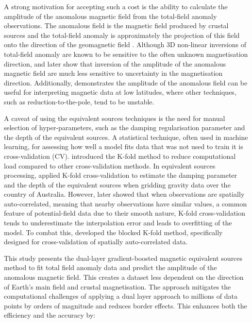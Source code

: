 A strong motivation for accepting such a cost is the ability to calculate the amplitude of the anomalous magnetic field from the total-field anomaly observations. The anomalous field is the magnetic field produced by crustal sources and the total-field anomaly is approximately the projection of this field onto the direction of the geomagnetic field \citep{Blakley1995}. Although 3D non-linear inversions of total-field anomaly are known to be sensitive to the often unknown magnetisation direction, \citet{Li2010_remanent} and later \citet{HidalgoGato2021} show that inversion of the amplitude of the anomalous magnetic field are much less sensitive to uncertainty in the magnetisation direction. Additionally, \citet{Melo2021} demonstrates the amplitude of the anomalous field can be useful for interpreting magnetic data at low latitudes, where other techniques, such as reduction-to-the-pole, tend to be unstable.

A caveat of using the equivalent sources techniques is the need for manual selection of hyper-parameters, such as the damping regularisation parameter and the depth of the equivalent sources. A statistical technique, often used in machine learning, for assessing how well a model fits data that was not used to train it is cross-validation (CV). \citet{Geisser1975} introduced the K-fold method to reduce computational load compared to other cross-validation methods. In equivalent sources processing, \citet{Soler2021} applied K-fold cross-validation to estimate the damping parameter and the depth of the equivalent sources when gridding gravity data over the country of Australia. However, \citet{Roberts2017} later showed that when observations are spatially auto-correlated, meaning that nearby observations have similar values, a common feature of potential-field data due to their smooth nature, K-fold cross-validation tends to underestimate the interpolation error and leads to overfitting of the model. To combat this, \citet{Roberts2017} developed the blocked K-fold method, specifically designed for cross-validation of spatially auto-correlated data.

This study presents the dual-layer gradient-boosted magnetic equivalent sources method to fit total field anomaly data and predict the amplitude of the anomalous magnetic field. This creates a dataset less dependent on the direction of Earth’s main field and crustal magnetisation. The approach mitigates the computational challenges of applying a dual layer approach to millions of data points by orders of magnitude and reduces border effects. This enhances both the efficiency and the accuracy by:

